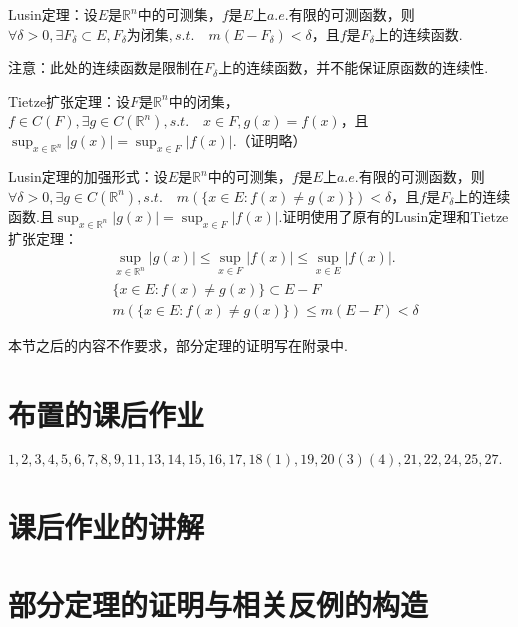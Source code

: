 \documentclass[bwprint, withoutpreface]{cumcmthesis}
\begin{document}
Lusin定理：设$E$是$\mathbb{R}^n$中的可测集，$f$是$E$上$a.e.$有限的可测函数，则$\forall \delta > 0, \exists F_{\delta} \subset E, F_{\delta}\mbox{为闭集}, s.t. \quad m(E - F_{\delta}) < \delta$，且$f$是$F_{\delta}$上的连续函数.

注意：此处的连续函数是限制在$F_{\delta}$上的连续函数，并不能保证原函数的连续性.

Tietze扩张定理：设$F$是$\mathbb{R}^n$中的闭集，$f \in C(F), \exists g \in C(\mathbb{R}^n), s.t. \quad x \in F, g(x) = f(x)$，且$\sup_{x \in \mathbb{R}^n}{|g(x)|} = \sup_{x \in F}{|f(x)|}$.（证明略）

Lusin定理的加强形式：设$E$是$\mathbb{R}^n$中的可测集，$f$是$E$上$a.e.$有限的可测函数，则$\forall \delta > 0, \exists g \in C(\mathbb{R}^n), s.t. \quad m(\{x \in E:f(x) \neq g(x)\}) < \delta$，且$f$是$F_{\delta}$上的连续函数.且$\sup_{x \in \mathbb{R}^n}{|g(x)|} = \sup_{x \in F}{|f(x)|}$.证明使用了原有的Lusin定理和Tietze扩张定理：
\begin{align*}
	& \sup_{x \in \mathbb{R}^n}{|g(x)|} \leqslant \sup_{x \in F}{|f(x)|} \leqslant \sup_{x \in E}{|f(x)|}. \\
	& \{x \in E:f(x) \neq g(x)\} \subset E - F \\
	& m(\{x \in E:f(x) \neq g(x)\}) \leqslant m(E - F) < \delta
\end{align*}

本节之后的内容不作要求，部分定理的证明写在附录中.

\appendix
\section{布置的课后作业}
\indent $1,2,3,4,5,6,7,8,9,11,13,14,15,16,17,18(1),19,20(3)(4),21,22,24,25,27.$

\section{课后作业的讲解}

\section{部分定理的证明与相关反例的构造}
\end{document}

